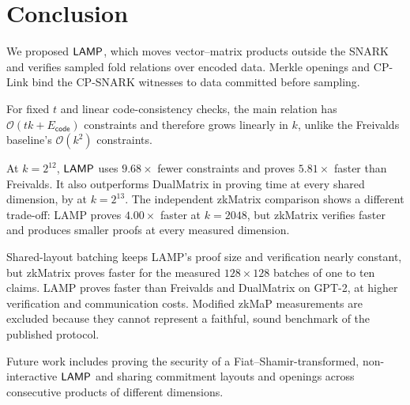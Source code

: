 \section{Conclusion}
  \label{sec:conclusion}

  We proposed \(\textsf{LAMP}\), which moves vector--matrix products outside the
  SNARK and verifies sampled fold relations over encoded data. Merkle openings
  and CP-Link bind the CP-SNARK witnesses to data committed before sampling.

  For fixed \(t\) and linear code-consistency checks, the main relation has
  \(\mathcal{O}(tk+E_{\mathsf{code}})\) constraints and therefore grows linearly
  in \(k\), unlike the Freivalds baseline's \(\mathcal{O}(k^2)\) constraints.

  \begin{revblock}
  At \(k=2^{12}\), \(\textsf{LAMP}\) uses \(9.68\times\) fewer constraints and proves
  \(5.81\times\) faster than Freivalds. It also outperforms
  DualMatrix in proving time at every shared dimension, by \revmath{3.62\times} at
  \(k=2^{13}\).
  The independent zkMatrix comparison shows a different trade-off: LAMP
  proves \(4.00\times\) faster at \(k=2048\), but zkMatrix verifies faster and
  produces smaller proofs at every measured dimension.
  \end{revblock}

  \begin{revblock}
  Shared-layout batching keeps LAMP's proof size and verification nearly
  constant, but zkMatrix proves faster for the measured \(128\times128\)
  batches of one to ten claims. LAMP proves faster than Freivalds and
  DualMatrix on GPT-2, at higher verification and communication costs.
  Modified zkMaP measurements are excluded because they cannot represent
  a faithful, sound benchmark of the published protocol.
  \end{revblock}

  \begin{revblock}
  Future work includes proving the security of a Fiat--Shamir-transformed,
  non-interactive \(\textsf{LAMP}\) and sharing commitment layouts and openings across
  consecutive products of different dimensions.
  \end{revblock}
